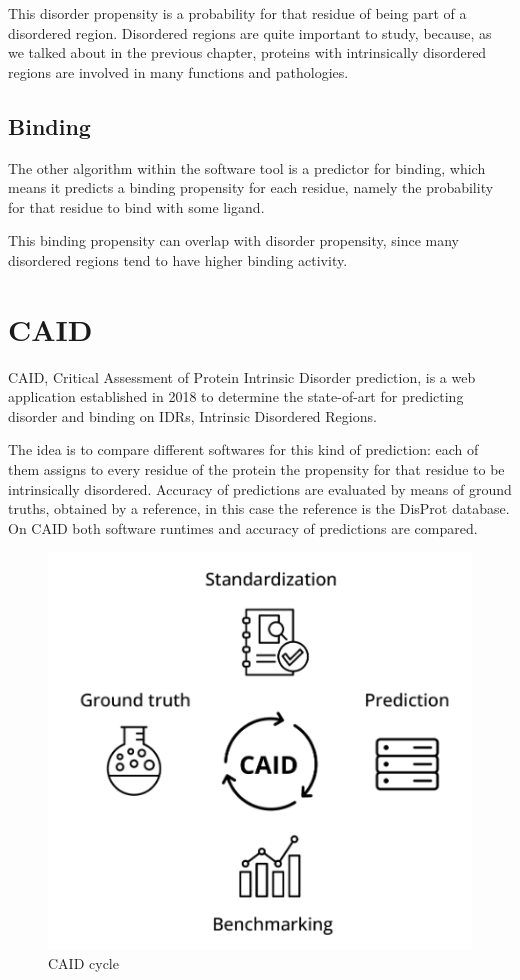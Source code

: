 This disorder propensity is a probability for that residue of being part of a disordered region. Disordered regions are quite important to study, because, as we talked about in the previous chapter, proteins with intrinsically disordered regions are involved in many functions and pathologies.

\subsection{Binding}
The other algorithm within the software tool is a predictor for binding, which means it predicts a binding propensity for each residue, namely the probability for that residue to bind with some ligand.

This binding propensity can overlap with disorder propensity, since many disordered regions tend to have higher binding activity.

\section{CAID}
CAID, Critical Assessment of Protein Intrinsic Disorder prediction, is a web application established in 2018 to determine the state-of-art for predicting disorder and binding on IDRs, Intrinsic Disordered Regions. 

The idea is to compare different softwares for this kind of prediction: each of them assigns to every residue of the protein the propensity for that residue to be intrinsically disordered. Accuracy of predictions are evaluated by means of ground truths, obtained by a reference, in this case the reference is the DisProt database. On CAID both software runtimes and accuracy of predictions are compared.

\begin{figure}
    \centering
    \includegraphics[scale=.5]{res/caid_cycle.png}
    \caption{CAID cycle}
\end{figure}


